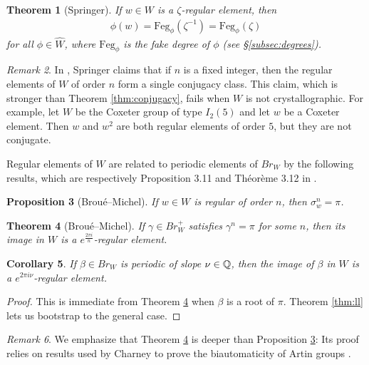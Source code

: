 \documentclass[a4paper,10pt,leqno]{amsart}
\theoremstyle{plain}
\theoremstyle{plain}
\newtheorem{thm}{Theorem}[subsection]
\theoremstyle{plain}
\newtheorem{cor}[thm]{Corollary}
\newtheorem{prop}[thm]{Proposition}
\theoremstyle{definition}
\theoremstyle{remark}
\newtheorem{rem}[thm]{Remark}
\newcommand{\Br}{\mathit{Br}}
\newcommand{\FDeg}{\mathrm{Feg}}
\begin{document}
\begin{thm}[Springer]\label{thm:fake-deg}
If $w \in W$ is a $\zeta$-regular element, then
\begin{align}
\phi(w) = \FDeg_\phi(\zeta^{-1}) = \FDeg_\phi(\zeta)
\end{align}
for all $\phi \in \hat{W}$, where $\FDeg_\phi$ is the fake degree of $\phi$ (see \S\ref{subsec:degrees}).
\end{thm}

\begin{rem}
In \cite[170]{springer_1974}, Springer claims that if $n$ is a fixed integer, then the regular elements of $W$ of order $n$ form a single conjugacy class.
This claim, which is stronger than Theorem \ref{thm:conjugacy}, fails when $W$ is not crystallographic.
For example, let $W$ be the Coxeter group of type $I_2(5)$ and let $w$ be a Coxeter element.
Then $w$ and $w^2$ are both regular elements of order $5$, but they are not conjugate.
\end{rem}

Regular elements of $W$ are related to periodic elements of $\Br_W$ by the following results, which are respectively Proposition 3.11 and Th\'eor\`eme 3.12 in \cite{bm_1997}.

\begin{prop}[Brou\'e--Michel]\label{prop:broue-michel}
If $w \in W$ is regular of order $n$, then $\sigma_w^n = \pi$.
\end{prop}

\begin{thm}[Brou\'e--Michel]\label{thm:broue-michel}
If $\gamma \in \Br_W^+$ satisfies $\gamma^n = \pi$ for some $n$, then its image in $W$ is a $e^{\frac{2\pi i}{n}}$-regular element.
\end{thm}

\begin{cor}\label{cor:regular}
If $\beta \in \Br_W$ is periodic of slope $\nu \in \mathbb{Q}$, then the image of $\beta$ in $W$ is a $e^{2\pi i\nu}$-regular element.
\end{cor}

\begin{proof}
This is immediate from Theorem \ref{thm:broue-michel} when $\beta$ is a root of $\pi$.
Theorem \ref{thm:ll} lets us bootstrap to the general case.
\end{proof}

\begin{rem}
We emphasize that Theorem \ref{thm:broue-michel} is deeper than Proposition \ref{prop:broue-michel}:
Its proof relies on results used by Charney to prove the biautomaticity of Artin groups \cite[\S{3.19}]{bm_1997}.
\end{rem}
\end{document}
